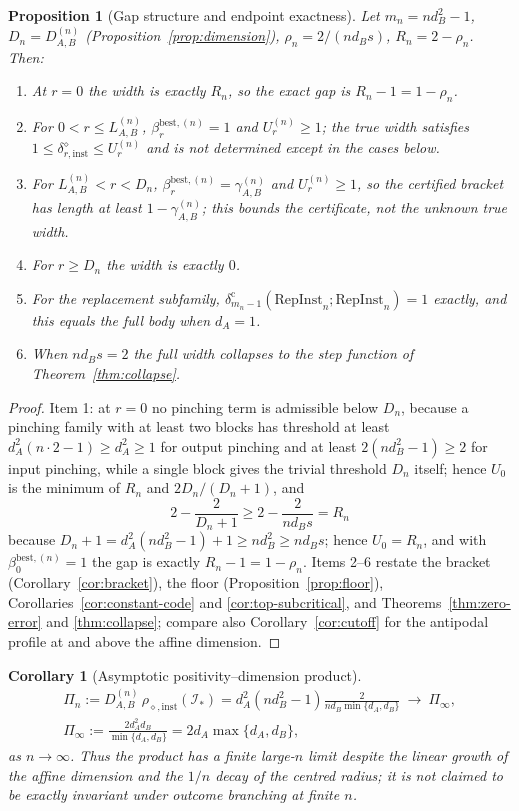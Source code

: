 \documentclass[11pt,a4paper]{article}
\newtheorem{proposition}[theorem]{Proposition}
\newtheorem{corollary}[theorem]{Corollary}
\newcommand{\RepInst}{\mathrm{RepInst}}
\begin{document}
\begin{proposition}[Gap structure and endpoint exactness]
\label{prop:gap}
Let $m_n=nd_B^2-1$, $D_n=D_{A,B}^{(n)}$ (Proposition~\ref{prop:dimension}), $\rho_n=2/(nd_Bs)$, $R_n=2-\rho_n$. Then:
\begin{enumerate}[leftmargin=*,itemsep=2pt]
\item At $r=0$ the width is exactly $R_n$, so the exact gap is $R_n-1=1-\rho_n$.
\item For $0<r\le L_{A,B}^{(n)}$, $\beta_r^{\mathrm{best},(n)}=1$ and $U_r^{(n)}\ge1$; the true width satisfies $1\le\delta_{r,\mathrm{inst}}^{\diamond}\le U_r^{(n)}$ and is not determined except in the cases below.
\item For $L_{A,B}^{(n)}<r<D_n$, $\beta_r^{\mathrm{best},(n)}=\gamma_{A,B}^{(n)}$ and $U_r^{(n)}\ge1$, so the \emph{certified} bracket has length at least $1-\gamma_{A,B}^{(n)}$; this bounds the certificate, not the unknown true width.
\item For $r\ge D_n$ the width is exactly $0$.
\item For the replacement subfamily, $\delta_{m_n-1}^{\mathrm c}(\RepInst_n;\RepInst_n)=1$ exactly, and this equals the full body when $d_A=1$.
\item When $nd_Bs=2$ the full width collapses to the step function of Theorem~\ref{thm:collapse}.
\end{enumerate}
\end{proposition}

\begin{proof}
Item 1: at $r=0$ no pinching term is admissible below $D_n$, because a pinching family with at least two blocks has threshold at least $d_A^2(n\cdot2-1)\ge d_A^2\ge1$ for output pinching and at least $2(nd_B^2-1)\ge2$ for input pinching, while a single block gives the trivial threshold $D_n$ itself; hence $U_0$ is the minimum of $R_n$ and $2D_n/(D_n+1)$, and
\[
2-\frac{2}{D_n+1}\ge 2-\frac{2}{nd_Bs}=R_n
\]
because $D_n+1=d_A^2(nd_B^2-1)+1\ge nd_B^2\ge nd_Bs$; hence $U_0=R_n$, and with $\beta_0^{\mathrm{best},(n)}=1$ the gap is exactly $R_n-1=1-\rho_n$. Items 2--6 restate the bracket (Corollary~\ref{cor:bracket}), the floor (Proposition~\ref{prop:floor}), Corollaries~\ref{cor:constant-code} and \ref{cor:top-subcritical}, and Theorems~\ref{thm:zero-error} and \ref{thm:collapse}; compare also Corollary~\ref{cor:cutoff} for the antipodal profile at and above the affine dimension.
\end{proof}

\begin{corollary}[Asymptotic positivity--dimension product]
\label{cor:asymptotic}
\begin{gather*}
\Pi_n:=D_{A,B}^{(n)}\,\rho_{\diamond,\mathrm{inst}}(\mathcal I_*)
=d_A^2(nd_B^2-1)\frac{2}{nd_B\min\{d_A,d_B\}}
\ \longrightarrow\ \Pi_\infty,\\
\Pi_\infty:=\frac{2d_A^2d_B}{\min\{d_A,d_B\}}
=2d_A\max\{d_A,d_B\},
\end{gather*}
as $n\to\infty$. Thus the product has a finite large-$n$ limit despite the linear growth of the affine dimension and the $1/n$ decay of the centred radius; it is not claimed to be exactly invariant under outcome branching at finite $n$.
\end{corollary}
\end{document}
